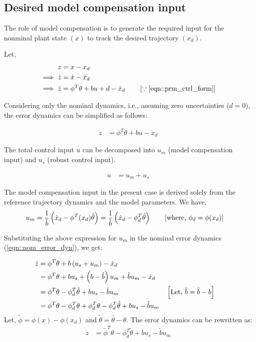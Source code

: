 \subsection{Desired model compensation input}
The role of model compensation is to generate the required input for the
nonminal plant state $(x)$ to track the desired trajectory $(x_d)$.

Let,
\begin{align}
    z &= x - x_d\\
    \implies \dot z &= \dot x - \dot x_d\\
    \implies \dot z &= \phi^T \theta +  bu + d - \dot x_d \qquad \left[ \because \ref{eqn::prm_ctrl_form} \right]
    \label{eqn::error_dyn}
\end{align}

Considering only the nominal dynamics, i.e., assuming zero uncertainties ($d = 0$), the error dynamics can be simplified as follows:

\begin{align}
    \dot z &= \phi^T \theta + bu - \dot x_d
    \label{eqn::nom_error_dyn}
\end{align}

The total control input $u$ can be decomposed into $u_m$ (model compensation input) and $u_s$ (robust control input).

\begin{align}
    u &= u_m + u_s
\end{align}

The model compensation input in the present case is derived solely from the
reference trajectory dynamics and the model parameters. We have,
\begin{align}
    u_m &= \frac{1}{\hat b} \left( \dot x_d - \phi^T(x_d) \hat \theta \right)
         = \frac{1}{\hat b} \left( \dot x_d - \phi^T_d \hat \theta \right)
         \qquad \left[ \text{where, } \phi_d  = \phi(x_d) \right]
\end{align}

Substituting the above expression for $u_m$ in the nominal error dynamics (\ref{eqn::nom_error_dyn}), we get:

\begin{align*}
    \dot z &= \phi^T \theta + b \left( u_s + u_m \right) - \dot x_d \\
    &= \phi^T \theta + bu_s + \left( b - \hat b \right) u_m  + \hat b u_m - \dot x_d \\
    &= \phi^T \theta - \phi^T_d \hat \theta + bu_s - \tilde b u_m
    &&\left[ \text{Let, } \tilde b = \hat b - b \right]\\
    &= \phi^T \theta - \phi^T_d \theta + \phi^T_d \theta - \phi^T_d \hat \theta + bu_s - \tilde b u_m\\
\end{align*}
Let, $\tilde \phi = \phi(x) - \phi(x_d)$ and $\tilde \theta = \hat \theta -
\theta$. The error dynamics can be rewritten as:
\begin{align}
    \dot z &= \tilde \phi^T \theta - \phi^T_d \tilde \theta + bu_s - \tilde b u_m \label{eqn::error_dyn_model_comp}
\end{align}

